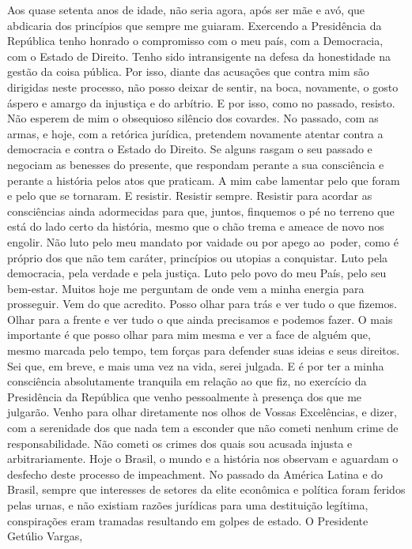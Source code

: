 Aos quase setenta anos de idade, não seria agora, após ser mãe e avó,
que abdicaria dos princípios que sempre me guiaram. Exercendo a
Presidência da República tenho honrado o compromisso com o meu país, com
a Democracia, com o Estado de Direito. Tenho sido intransigente na
defesa da honestidade na gestão da coisa pública. Por isso, diante das
acusações que contra mim são dirigidas neste processo, não posso deixar
de sentir, na boca, novamente, o gosto áspero e amargo da injustiça e do
arbítrio. E por isso, como no passado, resisto. Não esperem de mim o
obsequioso silêncio dos covardes. No passado, com as armas, e hoje, com
a retórica jurídica, pretendem novamente atentar contra a democracia e
contra o Estado do Direito. Se alguns rasgam o seu passado e negociam as
benesses do presente, que respondam perante a sua consciência e perante
a história pelos atos que praticam. A mim cabe lamentar pelo que foram e
pelo que se tornaram. E resistir. Resistir sempre. Resistir para acordar
as consciências ainda adormecidas para que, juntos, finquemos o pé no
terreno que está do lado certo da história, mesmo que o chão trema e
ameace de novo nos engolir. Não luto pelo meu mandato por vaidade ou por
apego ao~poder, como é próprio dos que não tem caráter, princípios ou
utopias a conquistar. Luto pela democracia, pela verdade e pela justiça.
Luto pelo povo do meu País, pelo seu bem-estar. Muitos hoje me perguntam
de onde vem a minha energia para prosseguir. Vem do que acredito. Posso
olhar para trás e ver tudo o que fizemos. Olhar para a frente e ver tudo
o que ainda precisamos e podemos fazer. O mais importante é que posso
olhar para mim mesma e ver a face de alguém que, mesmo marcada pelo
tempo, tem forças para defender suas ideias e seus direitos. Sei que, em
breve, e mais uma vez na vida, serei julgada. E é por ter a minha
consciência absolutamente tranquila em relação ao que fiz, no exercício
da Presidência da República que venho pessoalmente à presença dos que me
julgarão. Venho para olhar diretamente nos olhos de Vossas Excelências,
e dizer, com a serenidade dos que nada tem a esconder que não cometi
nenhum crime de responsabilidade. Não cometi os crimes dos quais sou
acusada injusta e arbitrariamente. Hoje o Brasil, o mundo e a história
nos observam e aguardam o desfecho deste processo de impeachment. No
passado da América Latina e do Brasil, sempre que interesses de setores
da elite econômica e política foram feridos pelas urnas, e não existiam
razões jurídicas para uma destituição legítima, conspirações eram
tramadas resultando em golpes de estado. O Presidente Getúlio Vargas,
